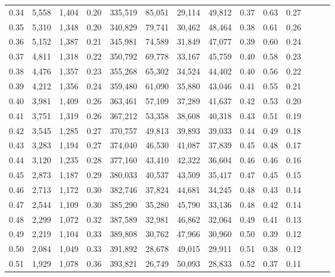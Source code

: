 \begin{tabular}{rrrrrrrrrrrrrr}
0.34 &   5,558 &  1,404 &  0.20 &  335,519 &   85,051 &  29,114 &  49,812 &  0.37 &  0.63 &      0.27 \\
0.35 &   5,310 &  1,348 &  0.20 &  340,829 &   79,741 &  30,462 &  48,464 &  0.38 &  0.61 &      0.26 \\
0.36 &   5,152 &  1,387 &  0.21 &  345,981 &   74,589 &  31,849 &  47,077 &  0.39 &  0.60 &      0.24 \\
0.37 &   4,811 &  1,318 &  0.22 &  350,792 &   69,778 &  33,167 &  45,759 &  0.40 &  0.58 &      0.23 \\
0.38 &   4,476 &  1,357 &  0.23 &  355,268 &   65,302 &  34,524 &  44,402 &  0.40 &  0.56 &      0.22 \\
0.39 &   4,212 &  1,356 &  0.24 &  359,480 &   61,090 &  35,880 &  43,046 &  0.41 &  0.55 &      0.21 \\
0.40 &   3,981 &  1,409 &  0.26 &  363,461 &   57,109 &  37,289 &  41,637 &  0.42 &  0.53 &      0.20 \\
0.41 &   3,751 &  1,319 &  0.26 &  367,212 &   53,358 &  38,608 &  40,318 &  0.43 &  0.51 &      0.19 \\
0.42 &   3,545 &  1,285 &  0.27 &  370,757 &   49,813 &  39,893 &  39,033 &  0.44 &  0.49 &      0.18 \\
0.43 &   3,283 &  1,194 &  0.27 &  374,040 &   46,530 &  41,087 &  37,839 &  0.45 &  0.48 &      0.17 \\
0.44 &   3,120 &  1,235 &  0.28 &  377,160 &   43,410 &  42,322 &  36,604 &  0.46 &  0.46 &      0.16 \\
0.45 &   2,873 &  1,187 &  0.29 &  380,033 &   40,537 &  43,509 &  35,417 &  0.47 &  0.45 &      0.15 \\
0.46 &   2,713 &  1,172 &  0.30 &  382,746 &   37,824 &  44,681 &  34,245 &  0.48 &  0.43 &      0.14 \\
0.47 &   2,544 &  1,109 &  0.30 &  385,290 &   35,280 &  45,790 &  33,136 &  0.48 &  0.42 &      0.14 \\
0.48 &   2,299 &  1,072 &  0.32 &  387,589 &   32,981 &  46,862 &  32,064 &  0.49 &  0.41 &      0.13 \\
0.49 &   2,219 &  1,104 &  0.33 &  389,808 &   30,762 &  47,966 &  30,960 &  0.50 &  0.39 &      0.12 \\
0.50 &   2,084 &  1,049 &  0.33 &  391,892 &   28,678 &  49,015 &  29,911 &  0.51 &  0.38 &      0.12 \\
0.51 &   1,929 &  1,078 &  0.36 &  393,821 &   26,749 &  50,093 &  28,833 &  0.52 &  0.37 &      0.11 \\

\end{tabular}
